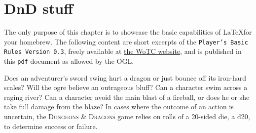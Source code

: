 \documentclass[headings=openany, headings=optiontoheadandtoc]{scrbook}
\newcommand{\TeXBrewery}{\TeX brewery}
\begin{document}
\begin{strip}

\vspace{1cm}

\begin{myfancybox}
\medskip

{\centering
{}
}
\end{myfancybox}
\end{strip}

\clearpage


\chapter{DnD stuff}
\label{showcase}

The only purpose of this chapter is to showcase the basic capabilities of \LaTeX  for your homebrew.
The following content are short excerpts of the \texttt{Player's Basic Rules Version 0.3}, freely available at \href{dungeonsanddragons.com}{the WoTC website}, and is published in this \texttt{pdf} document as allowed by the OGL.


Does an adventurer’s sword swing hurt a dragon or just bounce off its iron-hard scales? Will the ogre believe an outrageous bluff? Can a character swim across a raging river? Can a character avoid the main blast of a fireball, or does he or she take full damage from the blaze? In cases where the outcome of an action is uncertain, the \textsc{Dungeons \&  Dragons} game relies on rolls of a 20-sided die, a d20, to determine success or failure.
\end{document}
